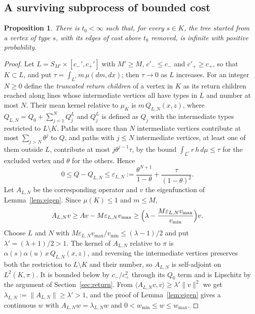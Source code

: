 \documentclass[11pt]{amsart}
\newtheorem{proposition}[theorem]{Proposition}
\theoremstyle{remark}
\numberwithin{equation}{section}
\newcommand{\1}{\mathbf 1}
\begin{document}
\subsection{A surviving subprocess of bounded cost}

\begin{proposition}\label{prop:bounded}
There is $t_0<\infty$ such that, for every $s\in K$, the tree started from a vertex of type $s$, with its edges of cost above $t_0$ removed, is infinite with positive probability.
\end{proposition}

\begin{proof}
Let $L=S_{M'}\times[c_-',c_+']$ with $M'\ge M$, $c'_-\le c_-$ and $c'_+\ge c_+$, so that $K\subset L$, and put $\tau=\int_{L^c}m\,\mu(dm,dx)$; then $\tau\to0$ as $L$ increases. For an integer $N\ge0$ define the \emph{truncated return children} of a vertex in $K$ as its return children reached along lines whose intermediate vertices all have types in $L$ and number at most $N$. Their mean kernel relative to $\mu_K$ is $m\,Q_{L,N}(x,z)$, where $Q_{L,N}=Q_0+\sum_{j=1}^NQ_j^{L}$ and $Q_j^{L}$ is defined as $Q_j$ with the intermediate types restricted to $L\setminus K$. Paths with more than $N$ intermediate vertices contribute at most $\sum_{j>N}\theta^j$ to $Q$, and paths with $j\le N$ intermediate vertices, at least one of them outside $L$, contribute at most $j\theta^{j-1}\tau$, by the bound $\int_{L^c}r\,h\,d\mu\le\tau$ for the excluded vertex and $\theta$ for the others. Hence
\[
0\le Q-Q_{L,N}\le\varepsilon_{L,N}:=\frac{\theta^{N+1}}{1-\theta}+\frac{\tau}{(1-\theta)^2}.
\]
Let $A_{L,N}$ be the corresponding operator and $v$ the eigenfunction of Lemma~\ref{lem:eigen}. Since $\mu(K)\le1$ and $m\le M$,
\[
A_{L,N}v\ge Av-M\varepsilon_{L,N}v_{\max}\ge\Bigl(\lambda-\frac{M\varepsilon_{L,N}v_{\max}}{v_{\min}}\Bigr)v .
\]
Choose $L$ and $N$ with $M\varepsilon_{L,N}v_{\max}/v_{\min}\le(\lambda-1)/2$ and put $\lambda'=(\lambda+1)/2>1$. The kernel of $A_{L,N}$ relative to $\pi$ is $\alpha(s)\alpha(u)\,x\,Q_{L,N}(x,z)$, and reversing the intermediate vertices preserves both the restriction to $L\setminus K$ and their number, so $A_{L,N}$ is self-adjoint on $L^2(K,\pi)$. It is bounded below by $c_-/c_+^2$ through its $Q_0$ term and is Lipschitz by the argument of Section~\ref{sec:return}. From $\langle A_{L,N}v,v\rangle\ge\lambda'\|v\|^2$ we get $\lambda_{L,N}:=\|A_{L,N}\|\ge\lambda'>1$, and the proof of Lemma~\ref{lem:eigen} gives a continuous $w$ with $A_{L,N}w=\lambda_{L,N}w$ and $0<w_{\min}\le w\le w_{\max}$.


\end{proof}
\end{document}
